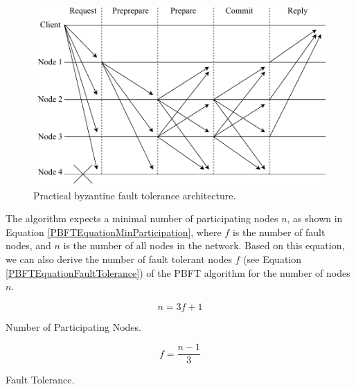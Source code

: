 \begin{figure}[h]
	\centering
	\includegraphics[width=0.9\linewidth]{obrazky-figures/PBFT.pdf}
	\caption{Practical byzantine fault tolerance architecture.}
	\label{PBFTDiagram}
\end{figure}


The algorithm expects a minimal number of participating nodes $n$, as shown in Equation \ref{PBFTEquationMinParticipation}, where $f$ is the number of fault nodes, and $n$ is the number of all nodes in the network. Based on this equation, we can also derive the number of fault tolerant nodes $f$ (see Equation \ref{PBFTEquationFaultTolerance}) of the PBFT algorithm for the number of nodes $n$. \\

\newenvironment{conditions}
  {\par\vspace{\abovedisplayskip}\noindent\begin{tabular}{>{$}l<{$} @{${}={}$} l}}
  {\end{tabular}\par\vspace{\belowdisplayskip}}
  

\begin{equation}
        n = 3 f + 1
    \label{PBFTEquationMinParticipation}
\end{equation}
\begin{center}
    Number of Participating Nodes.
\end{center}

\begin{equation}
        f  = \frac{n - 1}{3} 
    \label{PBFTEquationFaultTolerance}
\end{equation}
\begin{center}
    Fault Tolerance.
\end{center}

